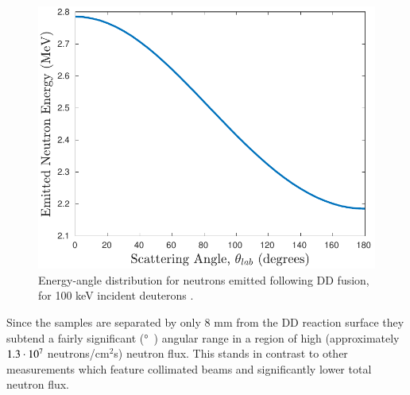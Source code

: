 \begin{figure}
 \centering
 \includegraphics[scale=0.6]{./figures/scatt_angle.pdf}
 \caption{Energy-angle distribution for neutrons emitted following DD fusion, for 100 keV incident deuterons \cite{Liskien_Paulsen_1973}.}
 \label{fig:scatt_angle}
\end{figure}

Since the samples are separated by only  8 mm from the DD reaction surface they  subtend a fairly significant  (\si{\degree}\ \degree)
angular range in a region of  high  (approximately $1.3 \cdot 10^{7}\ $neutrons/cm$^2$s) neutron flux.
This stands in contrast to other measurements which feature collimated beams and significantly lower total neutron flux.
 





